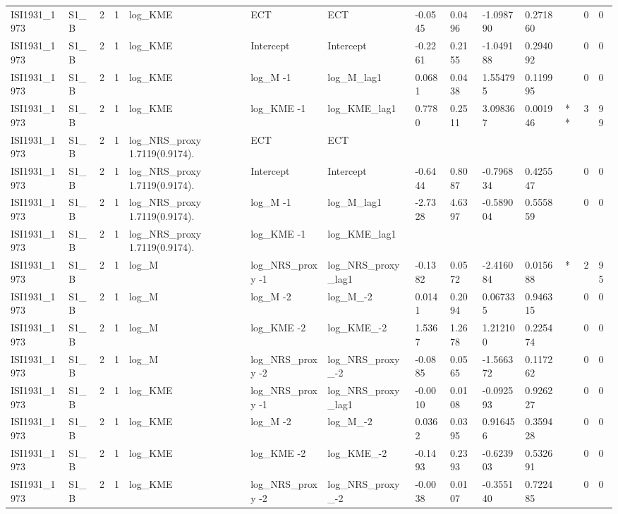 \begin{tabular}{llllllllllllll}
ISI1931\_1973 & S1\_B & 2 & 1 & log\_KME & ECT & ECT & -0.0545 & 0.0496 & -1.098790 & 0.271860 &  & 0 & 0 \\
ISI1931\_1973 & S1\_B & 2 & 1 & log\_KME & Intercept & Intercept & -0.2261 & 0.2155 & -1.049188 & 0.294092 &  & 0 & 0 \\
ISI1931\_1973 & S1\_B & 2 & 1 & log\_KME & log\_M -1 & log\_M\_lag1 & 0.0681 & 0.0438 & 1.554795 & 0.119995 &  & 0 & 0 \\
ISI1931\_1973 & S1\_B & 2 & 1 & log\_KME & log\_KME -1 & log\_KME\_lag1 & 0.7780 & 0.2511 & 3.098367 & 0.001946 & ** & 3 & 99 \\
ISI1931\_1973 & S1\_B & 2 & 1 & log\_NRS\_proxy 1.7119(0.9174). & ECT & ECT &  &  &  &  &  &  &  \\
ISI1931\_1973 & S1\_B & 2 & 1 & log\_NRS\_proxy 1.7119(0.9174). & Intercept & Intercept & -0.6444 & 0.8087 & -0.796834 & 0.425547 &  & 0 & 0 \\
ISI1931\_1973 & S1\_B & 2 & 1 & log\_NRS\_proxy 1.7119(0.9174). & log\_M -1 & log\_M\_lag1 & -2.7328 & 4.6397 & -0.589004 & 0.555859 &  & 0 & 0 \\
ISI1931\_1973 & S1\_B & 2 & 1 & log\_NRS\_proxy 1.7119(0.9174). & log\_KME -1 & log\_KME\_lag1 &  &  &  &  &  &  &  \\
ISI1931\_1973 & S1\_B & 2 & 1 & log\_M & log\_NRS\_proxy -1 & log\_NRS\_proxy\_lag1 & -0.1382 & 0.0572 & -2.416084 & 0.015688 & * & 2 & 95 \\
ISI1931\_1973 & S1\_B & 2 & 1 & log\_M & log\_M -2 & log\_M\_-2 & 0.0141 & 0.2094 & 0.067335 & 0.946315 &  & 0 & 0 \\
ISI1931\_1973 & S1\_B & 2 & 1 & log\_M & log\_KME -2 & log\_KME\_-2 & 1.5367 & 1.2678 & 1.212100 & 0.225474 &  & 0 & 0 \\
ISI1931\_1973 & S1\_B & 2 & 1 & log\_M & log\_NRS\_proxy -2 & log\_NRS\_proxy\_-2 & -0.0885 & 0.0565 & -1.566372 & 0.117262 &  & 0 & 0 \\
ISI1931\_1973 & S1\_B & 2 & 1 & log\_KME & log\_NRS\_proxy -1 & log\_NRS\_proxy\_lag1 & -0.0010 & 0.0108 & -0.092593 & 0.926227 &  & 0 & 0 \\
ISI1931\_1973 & S1\_B & 2 & 1 & log\_KME & log\_M -2 & log\_M\_-2 & 0.0362 & 0.0395 & 0.916456 & 0.359428 &  & 0 & 0 \\
ISI1931\_1973 & S1\_B & 2 & 1 & log\_KME & log\_KME -2 & log\_KME\_-2 & -0.1493 & 0.2393 & -0.623903 & 0.532691 &  & 0 & 0 \\
ISI1931\_1973 & S1\_B & 2 & 1 & log\_KME & log\_NRS\_proxy -2 & log\_NRS\_proxy\_-2 & -0.0038 & 0.0107 & -0.355140 & 0.722485 &  & 0 & 0 \\

\end{tabular}
